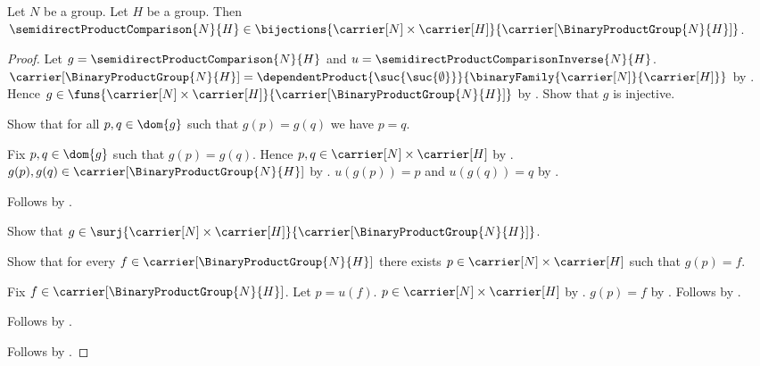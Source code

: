 \begin{theorem}\label{semidirect_product_comparison_bijection}
    Let $N$ be a group.
    Let $H$ be a group.
    Then $\semidirectProductComparison{N}{H}\in
        \bijections{\carrier[N]\times\carrier[H]}
            {\carrier[\BinaryProductGroup{N}{H}]}$.
\end{theorem}
\begin{proof}
    Let $g=\semidirectProductComparison{N}{H}$ and
        $u=\semidirectProductComparisonInverse{N}{H}$.
    $\carrier[\BinaryProductGroup{N}{H}]=
        \dependentProduct
            {\suc{\suc{\emptyset}}}
            {\binaryFamily{\carrier[N]}{\carrier[H]}}$ by
        .
    Hence $g\in\funs{\carrier[N]\times\carrier[H]}
        {\carrier[\BinaryProductGroup{N}{H}]}$ by
        .
    Show that $g$ is injective.
    \begin{subproof}
        Show that for all $p,q\in\dom{g}$ such that $g(p)=g(q)$ we have
            $p=q$.
        \begin{subproof}
            Fix $p,q\in\dom{g}$ such that $g(p)=g(q)$.
            Hence $p,q\in\carrier[N]\times\carrier[H]$ by
                .
            $g(p),g(q)\in\carrier[\BinaryProductGroup{N}{H}]$ by
                .
            $u(g(p))=p$ and $u(g(q))=q$ by
                .
        \end{subproof}
        Follows by .
    \end{subproof}
    Show that $g\in\surj{\carrier[N]\times\carrier[H]}
        {\carrier[\BinaryProductGroup{N}{H}]}$.
    \begin{subproof}
        Show that for every $f\in\carrier[\BinaryProductGroup{N}{H}]$
            there exists $p\in\carrier[N]\times\carrier[H]$ such that
                $g(p)=f$.
        \begin{subproof}
            Fix $f\in\carrier[\BinaryProductGroup{N}{H}]$.
            Let $p=u(f)$.
            $p\in\carrier[N]\times\carrier[H]$ by
                .
            $g(p)=f$ by
                .
            Follows by \auto.
        \end{subproof}
        Follows by .
    \end{subproof}
    Follows by .
\end{proof}

